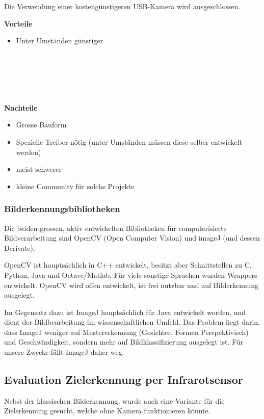 \documentclass[a4paper]{report}
\begin{document}
\noindent
Die Verwendung einer kostengünstigeren USB-Kamera wird ausgeschlossen.

\begin{multicols}{2}
	\textbf{Vorteile}
	\begin{itemize}[label={+},noitemsep]
		\item Unter Umständen günstiger
		\\
		\\
		\\
		\\
		\\
		\\
	\end{itemize}
	\columnbreak
	\textbf{Nachteile}
	\begin{itemize}[label={-},noitemsep]
		\item Grosse Bauform
		\item Spezielle Treiber nötig (unter Umständen müssen diese selber entwickelt werden)
		\item meist schwerer
		\item kleine Community für solche Projekte
	\end{itemize}
\end{multicols}

\subsubsection{Bilderkennungsbibliotheken}
\label{app:ssec:BilderkBib}
Die beiden grossen, aktiv entwickelten Bibliotheken für computerisierte Bildverarbeitung sind OpenCV (Open Computer Vision) und imageJ (und dessen Derivate).

OpenCV ist hauptsächlich in C++ entwickelt, besitzt aber Schnittstellen zu C, Python, Java und Octave/Matlab. Für viele sonstige Sprachen wurden Wrappers entwickelt. OpenCV wird offen entwickelt, ist frei nutzbar und auf Bilderkennung ausgelegt.

Im Gegensatz dazu ist ImageJ hauptsächlich für Java entwickelt worden, und dient der Bildbearbeitung im wissenschaftlichen Umfeld. Das Problem liegt darin, dass ImageJ weniger auf Mustererkennung (Gesichter, Formen Perspektivisch) und Geschwindigkeit, sondern mehr auf Bildklassifizierung ausgelegt ist. Für unsere Zwecke fällt ImageJ daher weg.

\subsection{Evaluation Zielerkennung per Infrarotsensor}
\label{app:ssec:EvalZielErkInfrarot}
Nebst der klassischen Bilderkennung, wurde auch eine Variante für die Zielerkennung gesucht, welche ohne Kamera funktionieren könnte.
\end{document}
